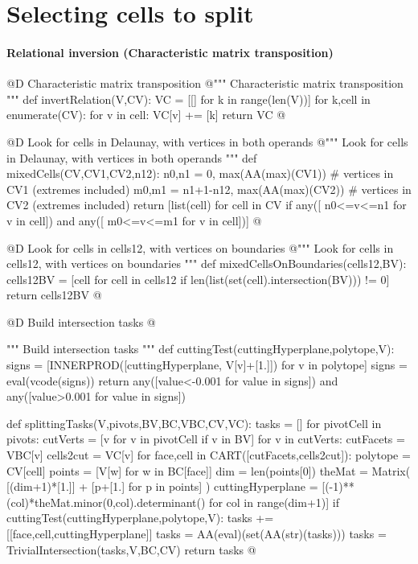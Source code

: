 \documentclass[11pt,oneside]{article}	%
\begin{document}
\section{Selecting cells to split}


\paragraph{Relational inversion (Characteristic matrix transposition)}

@D Characteristic matrix transposition
@{""" Characteristic matrix transposition """
def invertRelation(V,CV):
	VC = [[] for k in range(len(V))]
	for k,cell in enumerate(CV):
		for v in cell:
			VC[v] += [k]
	return VC
@}


@D Look for cells in Delaunay, with vertices in both operands
@{""" Look for cells in Delaunay, with vertices in both operands """
def mixedCells(CV,CV1,CV2,n12):
	n0,n1 = 0, max(AA(max)(CV1))			# vertices in CV1 (extremes included)
	m0,m1 = n1+1-n12, max(AA(max)(CV2))		# vertices in CV2 (extremes included)
	return [list(cell) for cell in CV if any([ n0<=v<=n1 for v in cell]) 
		and any([ m0<=v<=m1 for v in cell])]
@}

@D Look for cells in cells12, with vertices on boundaries
@{""" Look for cells in cells12, with vertices on boundaries """
def mixedCellsOnBoundaries(cells12,BV):
	cells12BV = [cell for cell in cells12
					if len(list(set(cell).intersection(BV))) != 0]
	return cells12BV
@}

@D Build intersection tasks
@{""" Build intersection tasks """
def cuttingTest(cuttingHyperplane,polytope,V):
	signs = [INNERPROD([cuttingHyperplane, V[v]+[1.]]) for v in polytope]
	signs = eval(vcode(signs))
	return any([value<-0.001 for value in signs]) and any([value>0.001 for value in signs])

def splittingTasks(V,pivots,BV,BC,VBC,CV,VC):
	tasks = []
	for pivotCell in pivots:
		cutVerts = [v for v in pivotCell if v in BV]
		for v in cutVerts:
			cutFacets = VBC[v]
			cells2cut = VC[v]
			for face,cell in CART([cutFacets,cells2cut]):
				polytope = CV[cell]
				points = [V[w] for w in BC[face]]
				dim = len(points[0])
				theMat = Matrix( [(dim+1)*[1.]] + [p+[1.] for p in points] )
				cuttingHyperplane = [(-1)**(col)*theMat.minor(0,col).determinant() 
									for col in range(dim+1)]
				if cuttingTest(cuttingHyperplane,polytope,V):
					tasks += [[face,cell,cuttingHyperplane]]
	tasks = AA(eval)(set(AA(str)(tasks)))
	tasks = TrivialIntersection(tasks,V,BC,CV)
	return tasks
@}
\end{document}
